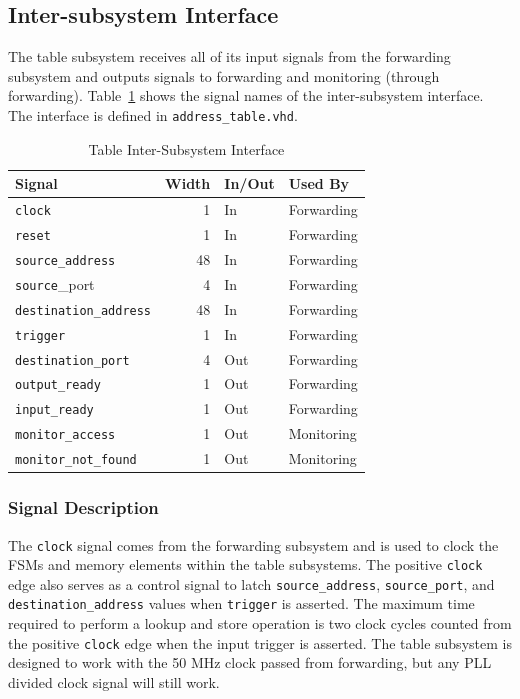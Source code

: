 \documentclass{article}
\begin{document}
\subsection{Inter-subsystem Interface}

The table subsystem receives all of its input signals from the forwarding subsystem and outputs signals to forwarding and monitoring (through forwarding). Table~\ref{tab:a} shows the signal names of the inter-subsystem interface. The interface is defined in \texttt{address\_table.vhd}.

\begin{table}[ht]
    \begin{center}
        \begin{tabular}{lrll}\hline
        Signal & Width & In/Out & Used By \\
        \hline
        \texttt{clock} & 1 & In & Forwarding \\
        \hline
        \texttt{reset} & 1 & In & Forwarding \\
        \hline
        \texttt{source\_address} & 48 & In & Forwarding \\
        \hline
        \texttt{source}\_port & 4 & In & Forwarding \\
        \hline
        \texttt{destination\_address} & 48 & In & Forwarding \\
        \hline
        \texttt{trigger} & 1 & In & Forwarding \\
        \hline
        \texttt{destination\_port} & 4 & Out & Forwarding \\
        \hline
        \texttt{output\_ready} & 1 & Out & Forwarding \\
        \hline
        \texttt{input\_ready} & 1 & Out & Forwarding \\
        \hline
        \texttt{monitor\_access} & 1 & Out & Monitoring \\
        \hline
        \texttt{monitor\_not\_found} & 1 & Out & Monitoring \\
        \hline
        \end{tabular}
        \caption{Table Inter-Subsystem Interface}\label{tab:a}
    \end{center}
\end{table}

\subsubsection{Signal Description}

The \texttt{clock} signal comes from the forwarding subsystem and is used to clock the FSMs and memory elements within the table subsystems. The positive \texttt{clock} edge also serves as a control signal to latch \texttt{source\_address}, \texttt{source\_port}, and \texttt{destination\_address} values when \texttt{trigger} is asserted. The maximum time required to perform a lookup and store operation is two clock cycles counted from the positive \texttt{clock} edge when the input trigger is asserted. The table subsystem is designed to work with the 50 MHz clock passed from forwarding, but any PLL divided clock signal will still work. 
\end{document}
